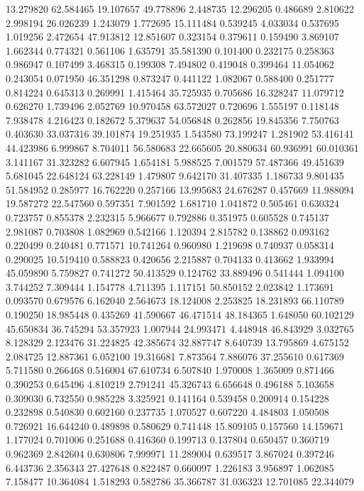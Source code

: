 13.279820
62.584465
19.107657
49.778896
2.448735
12.296205
0.486689
2.810622
2.998194
26.026239
1.243079
1.772695
15.111484
0.539245
4.033034
0.537695
1.019256
2.472654
47.913812
12.851607
0.323154
0.379611
0.159490
3.869107
1.662344
0.774321
0.561106
1.635791
35.581390
0.101400
0.232175
0.258363
0.986947
0.107499
3.468315
0.199308
7.494802
0.419048
0.399464
11.054062
0.243054
0.071950
46.351298
0.873247
0.441122
1.082067
0.588400
0.251777
0.814224
0.645313
0.269991
1.415464
35.725935
0.705686
16.328247
11.079712
0.626270
1.739496
2.052769
10.970458
63.572027
0.720696
1.555197
0.118148
7.938478
4.216423
0.182672
5.379637
54.056848
0.262856
19.845356
7.750763
0.403630
33.037316
39.101874
19.251935
1.543580
73.199247
1.281902
53.416141
44.423986
6.999867
8.704011
56.580683
22.665605
20.880634
60.936991
60.010361
3.141167
31.323282
6.607945
1.654181
5.988525
7.001579
57.487366
49.451639
5.681045
22.648124
63.228149
1.479807
9.642170
31.407335
1.186733
9.801435
51.584952
0.285977
16.762220
0.257166
13.995683
24.676287
0.457669
11.988094
19.587272
22.547560
0.597351
7.901592
1.681710
1.041872
0.505461
0.630324
0.723757
0.855378
2.232315
5.966677
0.792886
0.351975
0.605528
0.745137
2.981087
0.703808
1.082969
0.542166
1.120394
2.815782
0.138862
0.093162
0.220499
0.240481
0.771571
10.741264
0.960980
1.219698
0.740937
0.058314
0.290025
10.519410
0.588823
0.420656
2.215887
0.704133
0.413662
1.933994
45.059890
5.759827
0.741272
50.413529
0.124762
33.889496
0.541444
1.094100
3.744252
7.309444
1.154778
4.711395
1.117151
50.850152
2.023842
1.173691
0.093570
0.679576
6.162040
2.564673
18.124008
2.253825
18.231893
66.110789
0.190250
18.985448
0.435269
41.590667
46.471514
48.184365
1.648050
60.102129
45.650834
36.745294
53.357923
1.007944
24.993471
4.448948
46.843929
3.032765
8.128329
2.123476
31.224825
42.385674
32.887747
8.640739
13.795869
4.675152
2.084725
12.887361
6.052100
19.316681
7.873564
7.886076
37.255610
0.617369
5.711580
0.266468
0.516004
67.610734
6.507840
1.970008
1.365009
0.871466
0.390253
0.645496
4.810219
2.791241
45.326743
6.656648
0.496188
5.103658
0.309030
6.732550
0.985228
3.325921
0.141164
0.539458
0.200914
0.154228
0.232898
0.540830
0.602160
0.237735
1.070527
0.607220
4.484803
1.050508
0.726921
16.644240
0.489898
0.580629
0.741448
15.809105
0.157560
14.159671
1.177024
0.701006
0.251688
0.416360
0.199713
0.137804
0.650457
0.360719
0.962369
2.842604
0.630806
7.999971
11.289004
0.639517
3.867024
0.397246
6.443736
2.356343
27.427648
0.822487
0.660097
1.226183
3.956897
1.062085
7.158477
10.364084
1.518293
0.582786
35.366787
31.036323
12.701085
22.344079
